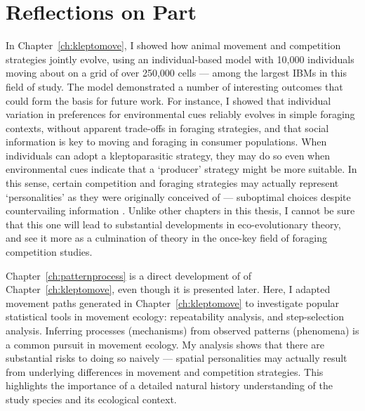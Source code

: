 \section*{Reflections on Part~}

In Chapter~\ref{ch:kleptomove}, I showed how animal movement and competition strategies jointly evolve, using an individual-based model with 10,000 individuals moving about on a grid of over 250,000 cells --- among the largest IBMs in this field of study.
The model demonstrated a number of interesting outcomes that could form the basis for future work.
For instance, I showed that individual variation in preferences for environmental cues reliably evolves in simple foraging contexts, without apparent trade-offs in foraging strategies, and that social information is key to moving and foraging in consumer populations.
When individuals can adopt a kleptoparasitic strategy, they may do so even when environmental cues indicate that a `producer' strategy \parencite{beauchamp2008} might be more suitable.
In this sense, certain competition and foraging strategies may actually represent `personalities' as they were originally conceived of --- suboptimal choices despite countervailing information \parencite{sih2004}.
Unlike other chapters in this thesis, I cannot be sure that this one will lead to substantial developments in eco-evolutionary theory, and see it more as a culmination of theory in the once-key field of foraging competition studies.

Chapter~\ref{ch:patternprocess} is a direct development of of Chapter~\ref{ch:kleptomove}, even though it is presented later.
Here, I adapted movement paths generated in Chapter~\ref{ch:kleptomove} to investigate popular statistical tools in movement ecology: repeatability analysis, and step-selection analysis.
Inferring processes (mechanisms) from observed patterns (phenomena) is a common pursuit in movement ecology.
My analysis shows that there are substantial risks to doing so naively --- spatial personalities \parencite{stuber2022} may actually result from underlying differences in movement and competition strategies.
This highlights the importance of a detailed natural history understanding of the study species and its ecological context.

